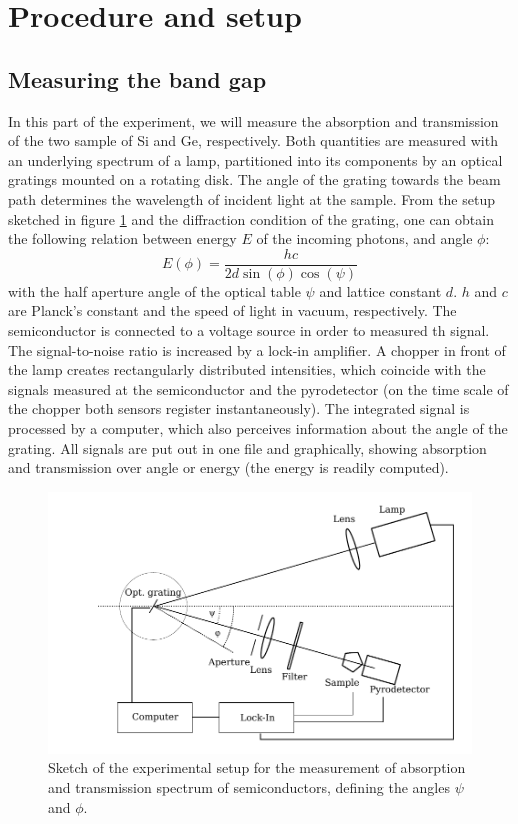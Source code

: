 \section{Procedure and setup}

\subsection{Measuring the band gap}
In this part of the experiment, we will measure the absorption and 
transmission of the two sample of Si and Ge, respectively. 
Both quantities are measured with an underlying spectrum of a lamp, 
partitioned into its components by an optical gratings mounted 
on a rotating disk. The angle of the grating towards the beam 
path determines the wavelength of incident light at the sample. 
From the setup sketched in figure \ref{fig:setup_band_gap} 
and the diffraction condition of the grating, one can obtain the following 
relation between energy $E$ of the incoming photons, and angle 
$\phi$:
\begin{equation}
    E(\phi) = \frac{h c}{2d \sin(\phi) \cos(\psi)}
    \label{eq:E_g}
\end{equation}
with the half aperture angle of the optical table $\psi$ and lattice 
constant $d$. $h$ and $c$ are Planck's constant and the speed of 
light in vacuum, respectively. The semiconductor is connected 
to a voltage source in order to measured th signal. 
The signal-to-noise ratio is increased by a lock-in amplifier. A chopper 
in front of the lamp creates rectangularly distributed intensities, 
which coincide with the signals measured at the semiconductor 
and the pyrodetector (on the time scale of the chopper 
    both sensors register instantaneously). 
The integrated signal is processed by a computer, which also
perceives information about the angle of the grating. 
All signals are put out in one file and graphically, showing absorption 
and transmission over angle or energy (the energy is readily computed). 

\begin{figure}
    \includegraphics[width=\textwidth]{figures/setup_band_gap}
    \caption{
        Sketch of the experimental setup for the measurement of 
        absorption and transmission spectrum of semiconductors, 
        defining the angles $\psi$ and $\phi$.
        }
    \label{fig:setup_band_gap}
\end{figure}

